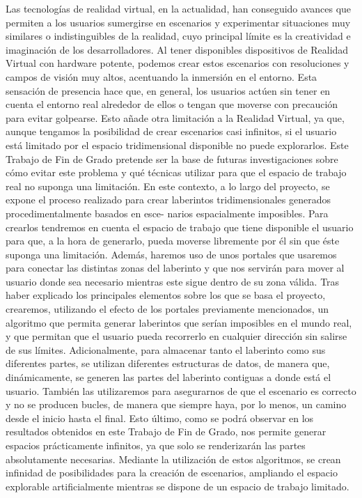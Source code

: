 \documentclass[a4paper]{report}
\begin{document}
Las tecnologías de realidad virtual, en la actualidad, han conseguido avances que permiten a los usuarios sumergirse en escenarios y experimentar situaciones muy similares o indistinguibles de la realidad, cuyo principal límite es la creatividad e imaginación de los desarrolladores. Al tener disponibles dispositivos de Realidad Virtual con hardware potente, podemos crear estos escenarios con resoluciones y campos de visión muy altos, acentuando la inmersión en el entorno.\vspace{2mm}\newline
Esta sensación de presencia hace que, en general, los usuarios actúen sin tener en cuenta el entorno real alrededor de ellos o tengan que moverse con precaución para evitar golpearse. Esto añade otra limitación a la Realidad Virtual, ya que, aunque tengamos la posibilidad de crear escenarios casi infinitos, si el usuario está limitado por el espacio tridimensional disponible no puede explorarlos. Este Trabajo de Fin de Grado pretende ser la base de futuras investigaciones sobre cómo evitar este problema y qué técnicas utilizar para que el espacio de trabajo real no suponga una limitación.\vspace{2mm}\newline
En este contexto, a lo largo del proyecto, se expone el proceso realizado para crear laberintos tridimensionales generados procedimentalmente basados en esce- narios espacialmente imposibles. Para crearlos tendremos en cuenta el espacio de trabajo que tiene disponible el usuario para que, a la hora de generarlo, pueda moverse libremente por él sin que éste suponga una limitación. Además, haremos uso de unos portales que usaremos para conectar las distintas zonas del laberinto y que nos servirán para mover al usuario donde sea necesario mientras este sigue dentro de su zona válida.\vspace{2mm}\newline
Tras haber explicado los principales elementos sobre los que se basa el proyecto, crearemos, utilizando el efecto de los portales previamente mencionados, un algoritmo que permita generar laberintos que serían imposibles en el mundo real, y que permitan que el usuario pueda recorrerlo en cualquier dirección sin salirse de sus límites.\vspace{2mm}\newline
Adicionalmente, para almacenar tanto el laberinto como sus diferentes partes, se utilizan diferentes estructuras de datos, de manera que, dinámicamente, se generen las partes del laberinto contiguas a donde está el usuario. También las utilizaremos para asegurarnos de que el escenario es correcto y no se producen bucles, de manera que siempre haya, por lo menos, un camino desde el inicio hasta el final.\vspace{2mm}\newline
Esto último, como se podrá observar en los resultados obtenidos en este Trabajo de Fin de Grado, nos permite generar espacios prácticamente infinitos, ya que solo se renderizarán las partes absolutamente necesarias. Mediante la utilización de estos algoritmos, se crean infinidad de posibilidades para la creación de escenarios, ampliando el espacio explorable artificialmente mientras se dispone de un espacio de trabajo limitado.
\end{document}

